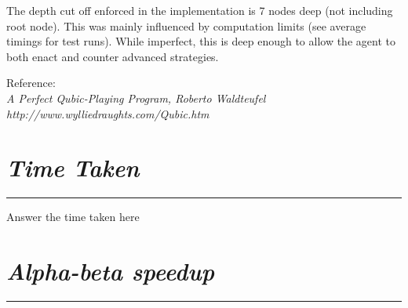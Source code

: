 \documentclass[10pt]{report}
\begin{document}
\begin{multicols}{2}
The depth cut off enforced in the implementation is 7 nodes deep (not including root node). This was mainly influenced by computation limits (see average timings for test runs). While imperfect, this is deep enough to allow the agent to both enact and counter advanced strategies.

Reference: \\
\em A Perfect Qubic-Playing Program\em, Roberto Waldteufel\\
http://www.wylliedraughts.com/Qubic.htm

\section*{\emph{{Time Taken}}}
\hrule
\vspace{0.4cm}

Answer the time taken here

\section*{\emph{\textmd{Alpha-beta speedup}}}
\hrule
\vspace{0.4cm}


\end{multicols}
\end{document}
